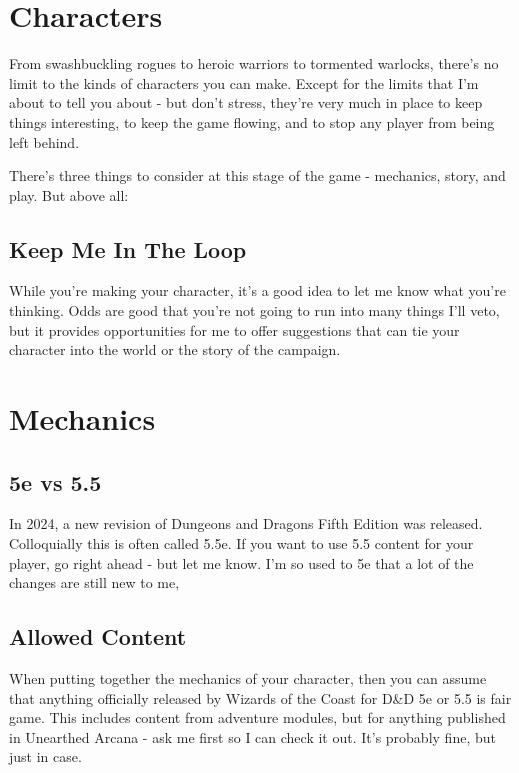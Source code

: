 \section {Characters}

From swashbuckling rogues to heroic warriors to tormented warlocks, there's no limit to the kinds of characters you can make. Except for the limits that I'm about to tell you about - but don't stress, they're very much in place to keep things interesting, to keep the game flowing, and to stop any player from being left behind.

There's three things to consider at this stage of the game - mechanics, story, and play. But above all:

\subsection {Keep Me In The Loop}

While you're making your character, it's a good idea to let me know what you're thinking. Odds are good that you're not going to run into many things I'll veto, but it provides opportunities for me to offer suggestions that can tie your character into the world or the story of the campaign.

\section {Mechanics}

\subsection {5e vs 5.5}

In 2024, a new revision of Dungeons and Dragons Fifth Edition was released. Colloquially this is often called 5.5e. If you want to use 5.5 content for your player, go right ahead - but let me know. I'm so used to 5e that a lot of the changes are still new to me, 

\subsection {Allowed Content}

When putting together the mechanics of your character, then you can assume that anything officially released by Wizards of the Coast for D\&D 5e or 5.5 is fair game. This includes content from adventure modules, but for anything published in Unearthed Arcana - ask me first so I can check it out. It's probably fine, but just in case.


